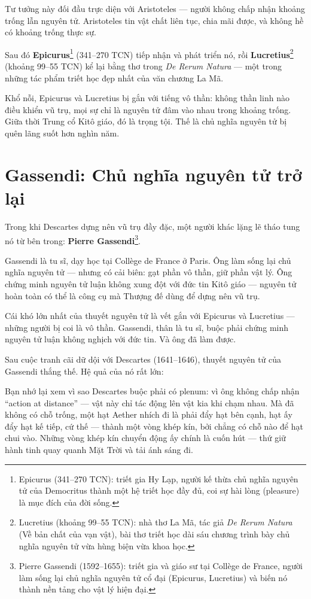 Tư tưởng này đối đầu trực diện với Aristoteles — người không chấp nhận khoảng trống lẫn nguyên tử. Aristoteles tin vật chất liên tục, chia mãi được, và không hề có khoảng trống thực sự.

Sau đó \textbf{Epicurus}\footnote{Epicurus (341--270 TCN): triết gia Hy Lạp, người kế thừa chủ nghĩa nguyên tử của Democritus thành một hệ triết học đầy đủ, coi sự hài lòng (pleasure) là mục đích của đời sống.} (341--270 TCN) tiếp nhận và phát triển nó, rồi \textbf{Lucretius}\footnote{Lucretius (khoảng 99--55 TCN): nhà thơ La Mã, tác giả \emph{De Rerum Natura} (Về bản chất của vạn vật), bài thơ triết học dài sáu chương trình bày chủ nghĩa nguyên tử vừa hùng biện vừa khoa học.} (khoảng 99--55 TCN) kể lại bằng thơ trong \emph{De Rerum Natura} — một trong những tác phẩm triết học đẹp nhất của văn chương La Mã.

Khổ nỗi, Epicurus và Lucretius bị gắn với tiếng vô thần: không thần linh nào điều khiển vũ trụ, mọi sự chỉ là nguyên tử đâm vào nhau trong khoảng trống. Giữa thời Trung cổ Kitô giáo, đó là trọng tội. Thế là chủ nghĩa nguyên tử bị quên lãng suốt hơn nghìn năm.


\section{Gassendi: Chủ nghĩa nguyên tử trở lại}

Trong khi Descartes dựng nên vũ trụ đầy đặc, một người khác lặng lẽ tháo tung nó từ bên trong: \textbf{Pierre Gassendi}\footnote{Pierre Gassendi (1592--1655): triết gia và giáo sư tại Collège de France, người làm sống lại chủ nghĩa nguyên tử cổ đại (Epicurus, Lucretius) và biến nó thành nền tảng cho vật lý hiện đại.}.

Gassendi là tu sĩ, dạy học tại Collège de France ở Paris. Ông làm sống lại chủ nghĩa nguyên tử — nhưng có cải biên: gạt phần vô thần, giữ phần vật lý. Ông chứng minh nguyên tử luận không xung đột với đức tin Kitô giáo — nguyên tử hoàn toàn có thể là công cụ mà Thượng đế dùng để dựng nên vũ trụ.

Cái khó lớn nhất của thuyết nguyên tử là vết gắn với Epicurus và Lucretius — những người bị coi là vô thần. Gassendi, thân là tu sĩ, buộc phải chứng minh nguyên tử luận không nghịch với đức tin. Và ông đã làm được.

Sau cuộc tranh cãi dữ dội với Descartes (1641--1646), thuyết nguyên tử của Gassendi thắng thế. Hệ quả của nó rất lớn:

Bạn nhớ lại xem vì sao Descartes buộc phải có plenum: vì ông không chấp nhận “action at distance” — vật này chỉ tác động lên vật kia khi chạm nhau. Mà đã không có chỗ trống, một hạt Aether nhích đi là phải đẩy hạt bên cạnh, hạt ấy đẩy hạt kế tiếp, cứ thế — thành một vòng khép kín, bởi chẳng có chỗ nào để hạt chui vào. Những vòng khép kín chuyển động ấy chính là cuốn hút — thứ giữ hành tinh quay quanh Mặt Trời và tải ánh sáng đi.

